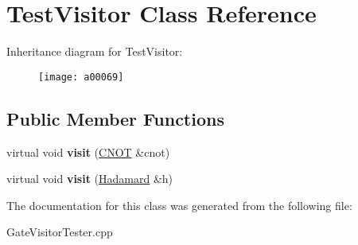 \hypertarget{a00069}{}\section{Test\+Visitor Class Reference}
\label{a00069}
Inheritance diagram for Test\+Visitor\+:\begin{figure}[H]
\begin{center}
\leavevmode
\texttt{[image: a00069]}
\end{center}
\end{figure}
\subsection*{Public Member Functions}
\begin{DoxyCompactItemize}
\item 
virtual void {\bfseries visit} (\hyperlink{a00019}{C\+N\+OT} \&cnot)\hypertarget{a00069_a2766c0664632ae33300eb9e663a26005}{}\label{a00069_a2766c0664632ae33300eb9e663a26005}

\item 
virtual void {\bfseries visit} (\hyperlink{a00036}{Hadamard} \&h)\hypertarget{a00069_a0a0f77d3f19f9bda449318a52031f2d4}{}\label{a00069_a0a0f77d3f19f9bda449318a52031f2d4}

\end{DoxyCompactItemize}


The documentation for this class was generated from the following file\+:\begin{DoxyCompactItemize}
\item 
Gate\+Visitor\+Tester.\+cpp\end{DoxyCompactItemize}
